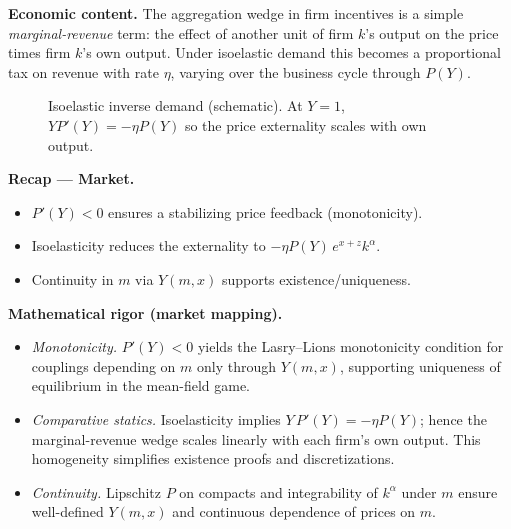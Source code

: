 ﻿\documentclass[11pt,letterpaper,oneside]{article}
\numberwithin{equation}{section}
\newcommand{\1}{\mathbf{1}}
\begin{document}
\begin{tcolorbox}[didacticstyle]
\textbf{Economic content.} The aggregation wedge in firm incentives is a simple \emph{marginal-revenue} term: the effect of another unit of firm $k$'s output on the price times firm $k$'s own output. Under isoelastic demand this becomes a proportional tax on revenue with rate $\eta$, varying over the business cycle through $P(Y)$.
\end{tcolorbox}

\begin{figure}[ht]
\centering
{}
\caption{Isoelastic inverse demand (schematic). At $Y=1$, $Y P'(Y)=-\eta P(Y)$ so the price externality scales with own output.}
\end{figure}

\begin{tcolorbox}[didacticstyle]
\textbf{Recap --- Market.}
\begin{itemize}[leftmargin=1.15em,itemsep=0.2em]
  \item $P'(Y)<0$ ensures a stabilizing price feedback (monotonicity).
  \item Isoelasticity reduces the externality to $-\eta P(Y)\,e^{x+z}k^\alpha$.
  \item Continuity in $m$ via $Y(m,x)$ supports existence/uniqueness.
\end{itemize}
\end{tcolorbox}

\begin{tcolorbox}[mathstyle]
\textbf{Mathematical rigor (market mapping).}
\begin{itemize}[leftmargin=1.15em,itemsep=0.25em]
  \item \emph{Monotonicity.} $P'(Y)<0$ yields the Lasry--Lions monotonicity condition for couplings depending on $m$ only through $Y(m,x)$, supporting uniqueness of equilibrium in the mean-field game.
  \item \emph{Comparative statics.} Isoelasticity implies $Y\,P'(Y)=-\eta P(Y)$; hence the marginal-revenue wedge scales linearly with each firm's own output. This homogeneity simplifies existence proofs and discretizations.
  \item \emph{Continuity.} Lipschitz $P$ on compacts and integrability of $k^\alpha$ under $m$ ensure well-defined $Y(m,x)$ and continuous dependence of prices on $m$.
\end{itemize}
\end{tcolorbox}
\end{document}
